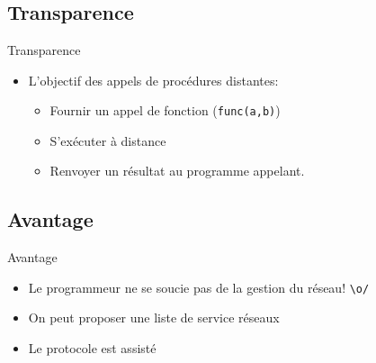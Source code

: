 \section{\sectitle}
\begin{frame}[containsverbatim]{\sectitle}
    \def\subsectitle{Transparence}
    \subsection{\subsectitle}
    \begin{block}{\subsectitle}
        \begin{itemize}
            \item L'objectif des appels de procédures distantes:
                \begin{itemize}
                    \item Fournir un appel de fonction (\verb+func(a,b)+)
                    \item S'exécuter à distance
                    \item Renvoyer un résultat au programme appelant.
                \end{itemize}
        \end{itemize}
    \end{block}
    \def\subsectitle{Avantage}
    \subsection{\subsectitle}
    \begin{block}{\subsectitle}
        \begin{itemize}
            \item Le programmeur ne se soucie pas de la gestion du réseau!
                \verb+\o/+
            \item On peut proposer une liste de service réseaux
            \item Le protocole est assisté
        \end{itemize}
    \end{block}
\end{frame}

\def\sectitle{Outils connus}
